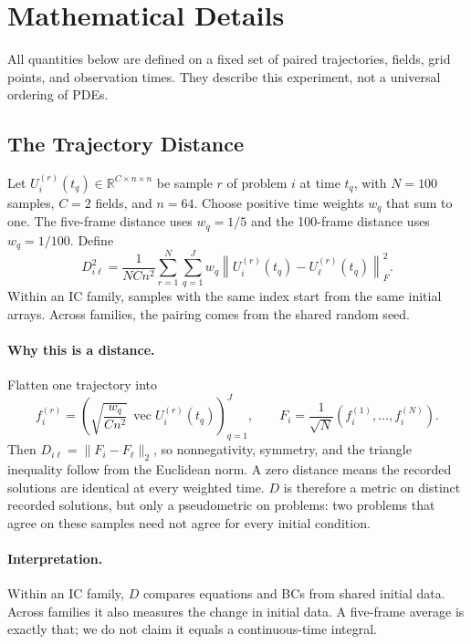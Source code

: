 \section{Mathematical Details}
\label{app:simple-math}
All quantities below are defined on a fixed set of paired trajectories, fields, grid points, and observation times. They describe this experiment, not a universal ordering of PDEs.

\subsection{The Trajectory Distance}
\label{app:trajectory-distance}
Let $U_i^{(r)}(t_q)\in\mathbb R^{C\times n\times n}$ be sample $r$ of problem $i$ at time $t_q$, with $N=100$ samples, $C=2$ fields, and $n=64$. Choose positive time weights $w_q$ that sum to one. The five-frame distance uses $w_q=1/5$ and the 100-frame distance uses $w_q=1/100$. Define
\begin{equation}
 D_{i\ell}^2=\frac{1}{NCn^2}\sum_{r=1}^{N}\sum_{q=1}^{J}w_q
 \left\|U_i^{(r)}(t_q)-U_\ell^{(r)}(t_q)\right\|_F^2.
\label{eq:appendix-rms}
\end{equation}
Within an IC family, samples with the same index start from the same initial arrays. Across families, the pairing comes from the shared random seed.

\paragraph{Why this is a distance.}
Flatten one trajectory into
\[
 f_i^{(r)}=\left(\sqrt{\frac{w_q}{Cn^2}}\,
       \operatorname{vec}U_i^{(r)}(t_q)\right)_{q=1}^{J},
 \qquad F_i=\frac{1}{\sqrt N}\left(f_i^{(1)},\ldots,f_i^{(N)}\right).
\]
Then $D_{i\ell}=\|F_i-F_\ell\|_2$, so nonnegativity, symmetry, and the triangle inequality follow from the Euclidean norm. A zero distance means the recorded solutions are identical at every weighted time. $D$ is therefore a metric on distinct recorded solutions, but only a pseudometric on problems: two problems that agree on these samples need not agree for every initial condition.

\paragraph{Interpretation.}
Within an IC family, $D$ compares equations and BCs from shared initial data. Across families it also measures the change in initial data. A five-frame average is exactly that; we do not claim it equals a continuous-time integral.

